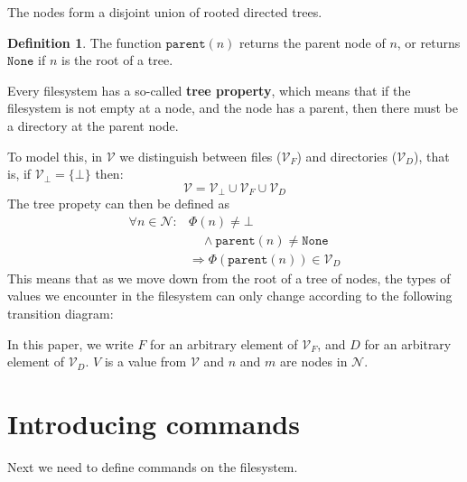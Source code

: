 \documentclass[12pt]{article}
\newcommand{\setv}{\mathcal{V}} %
\newcommand{\setvx}[1]{\mathcal{V}_{#1}}
\newcommand{\setf}{\setvx{F}} %
\newcommand{\setd}{\setvx{D}} %
\newcommand{\setb}{\setvx{\empt}} %
\newcommand{\setn}{\mathcal{N}} %
\newcommand{\empt}{\bot}
\newcommand{\parent}{\mathtt{parent}}
\newcommand{\topnode}{\mathtt{None}} %
\newcommand{\FS}{\Phi} %
\theoremstyle{definition}
\newtheorem{mydef}{Definition}
\begin{document}
The nodes form a disjoint union of rooted directed trees.
\begin{mydef}
The function $\parent(n)$ returns the parent node of $n$, or
returns $\topnode$ if $n$ is the root of a tree.
\end{mydef}

Every filesystem has a so-called \textbf{tree property}, which means that
if the filesystem is not empty at a node, and the node has a parent,
then there must be a directory at the parent node.

To model this, in $\setv$ we distinguish between files ($\setf$) and directories ($\setd$), that is,
if $\setb = \{\empt\}$ then:
\[ \setv = \setb \cup \setf \cup \setd \]
The tree propety can then be defined as
\begin{align*}
\forall n\in\setn: &\FS(n) \neq \empt \\ %
&\quad\wedge \parent(n) \neq \topnode \\
&\Rightarrow \FS(\parent(n)) \in \setd 
\end{align*}
This means that as we move down from the root of a tree of nodes,
the types of values we encounter in the filesystem can only change according to the following
transition diagram:



In this paper, we write $F$ for an arbitrary element of $\setf$, and $D$ for an arbitrary element
of $\setd$. $V$ is a value from $\setv$ and $n$ and $m$ are nodes in $\setn$.






\section{Introducing commands}

Next we need to define commands on the filesystem.

\end{document}
